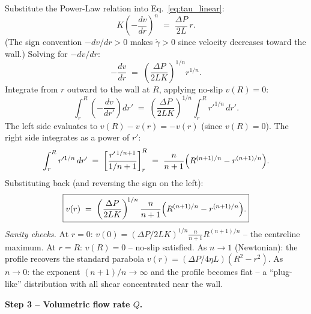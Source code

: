 \documentclass[11pt,a4paper]{article}
\newcommand{\gd}{\dot{\gamma}}
\begin{document}
\begin{derivationbox}[title={DERIVATION --- Power-Law pipe flow: velocity profile, $Q(\tau_w)$, and inversion to $\tau_w(Q)$}]
Substitute the Power-Law relation into Eq.~\eqref{eq:tau_linear}:
\[
K\!\left(-\frac{dv}{dr}\right)^{\!n} \;=\; \frac{\Delta P}{2L}\,r.
\]
(The sign convention $-dv/dr>0$ makes $\gd>0$ since velocity decreases
toward the wall.) Solving for $-dv/dr$:
\[
-\frac{dv}{dr} \;=\; \left(\frac{\Delta P}{2LK}\right)^{\!1/n} r^{1/n}.
\]
Integrate from $r$ outward to the wall at $R$, applying no-slip $v(R)=0$:
\[
\int_r^R\!\left(-\frac{dv}{dr'}\right)dr' \;=\;
\left(\frac{\Delta P}{2LK}\right)^{\!1/n}
\int_r^R r'^{1/n}\,dr'.
\]
The left side evaluates to $v(R)-v(r)=-v(r)$ (since $v(R)=0$).
The right side integrates as a power of $r'$:
\[
\int_r^R r'^{1/n}\,dr'
\;=\; \left[\frac{r'^{\,1/n+1}}{1/n+1}\right]_r^R
\;=\; \frac{n}{n+1}\Bigl(R^{(n+1)/n}-r^{(n+1)/n}\Bigr).
\]
Substituting back (and reversing the sign on the left):
\begin{equation}
\boxed{v(r) \;=\;
\left(\frac{\Delta P}{2LK}\right)^{\!1/n}
\frac{n}{n+1}
\Bigl(R^{(n+1)/n}-r^{(n+1)/n}\Bigr).}
\label{eq:vr_PL}
\end{equation}
\textit{Sanity checks.} At $r=0$: $v(0)=\left(\Delta P/2LK\right)^{1/n}
\frac{n}{n+1}R^{(n+1)/n}$ -- the centreline maximum. At $r=R$: $v(R)=0$
-- no-slip satisfied. As $n\to 1$ (Newtonian): the profile recovers the
standard parabola $v(r)=(\Delta P/4\eta L)(R^2-r^2)$.
As $n\to 0$: the exponent $(n+1)/n\to\infty$ and the profile becomes
flat -- a ``plug-like'' distribution with all shear concentrated
near the wall.

\medskip\noindent\textbf{Step 3 -- Volumetric flow rate $Q$.}


\end{derivationbox}
\end{document}
